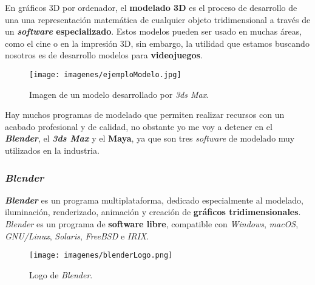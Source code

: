 En gráficos 3D por ordenador, el \textbf{modelado 3D} es el proceso de desarrollo de una una representación matemática de cualquier objeto tridimensional a través de un \textbf{\textit{software} especializado}. Estos modelos pueden ser usado en muchas áreas, como el cine o en la impresión 3D, sin embargo, la utilidad que estamos buscando nosotros es de desarrollo modelos para \textbf{videojuegos}.
\\

\begin{figure}[H]
	
	\vspace{-10pt}
	\begin{center}
		
		\texttt{[image: imagenes/ejemploModelo.jpg]}
		\caption{Imagen de un modelo desarrollado por \textit{3ds Max}.}
	\end{center}
	\vspace{-40pt}
\end{figure}

Hay muchos programas de modelado que permiten realizar recursos con un acabado profesional y de calidad, no obstante yo me voy a detener en el \textbf{\textit{Blender}}, el \textbf{\textit{3ds Max}} y el \textbf{Maya\textit{}}, ya que son tres \textit{software} de modelado muy utilizados en la industria.
\\

\subsubsection{\textit{Blender}}

\textit{\textbf{Blender}} es un programa multiplataforma, dedicado especialmente al modelado, iluminación, renderizado, animación y creación de \textbf{gráficos tridimensionales}. \textit{Blender} es un programa de \textbf{software libre}, compatible con \textit{Windows}, \textit{macOS}, \textit{GNU/Linux}, \textit{Solaris}, \textit{FreeBSD} e \textit{IRIX}.
\\

\begin{wrapfigure}{i}{0.6\textwidth}
	\vspace{-30pt}
	\begin{center}
		\vspace{-10pt}
		\texttt{[image: imagenes/blenderLogo.png]}
		\caption{Logo de \textit{Blender}.}
		\vspace{-10pt}
	\end{center}
	\vspace{-30pt}
\end{wrapfigure}

